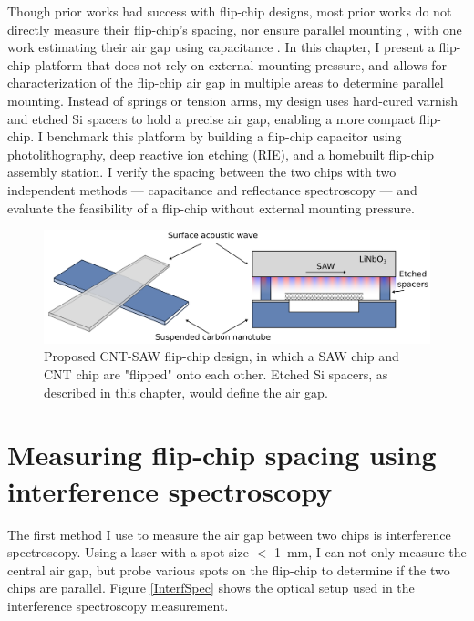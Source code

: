\documentclass{beavtex_dub_edit}
\begin{document}
Though prior works had success with flip-chip designs, most prior works do not directly measure their flip-chip’s spacing, nor ensure parallel mounting \cite{chu_creation_2018,satzinger_quantum_2018, bennaceur_mechanical_2015}, with one work estimating their air gap using capacitance \cite{beukman_noninvasive_2015}. In this chapter, I present a flip-chip platform that does not rely on external mounting pressure, and allows for characterization of the flip-chip air gap in multiple areas to determine parallel mounting. Instead of springs or tension arms, my design uses hard-cured varnish and etched Si spacers to hold a precise air gap, enabling a more compact flip-chip. I benchmark this platform by building a flip-chip capacitor using photolithography, deep reactive ion etching (RIE), and a homebuilt flip-chip assembly station. I verify the spacing between the two chips with two independent methods — capacitance and reflectance spectroscopy — and evaluate the feasibility of a flip-chip without external mounting pressure.

\begin{figure}
    \includegraphics[width=1\textwidth]{Flip-chip intro figure.png}
    \caption{Proposed CNT-SAW flip-chip design, in which a SAW chip and CNT chip are "flipped" onto each other. Etched Si spacers, as described in this chapter, would define the air gap.}
    \label{flip-chip intro figure}
\end{figure}

\section{Measuring flip-chip spacing using interference spectroscopy}

The first method I use to measure the air gap between two chips is interference spectroscopy. Using a laser with a spot size $<$ \SI{1}{\milli\meter}, I can not only measure the central air gap, but probe various spots on the flip-chip to determine if the two chips are parallel. Figure \ref{InterfSpec} shows the optical setup used in the interference spectroscopy measurement.
\end{document}
